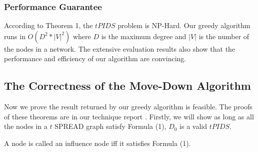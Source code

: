 \subsubsection*{Performance Guarantee}
According to Theorem 1, the $tPIDS$ problem is NP-Hard. Our greedy algorithm runs in $O(D^2*|V|^2)$ where $D$ is the maximum degree and $|V|$ is the number of the nodes in a network. The extensive evaluation results also show that the performance and efficiency of our algorithm are convincing.
\subsection{The Correctness of the Move-Down Algorithm}
Now we prove the result returned by our greedy algorithm is feasible. The proofs of these theorems are in our technique report\cite{ShiTech} .
Firstly, we will show as long as all the nodes in a $t$ SPREAD graph satisfy Formula (1), $D_0$ is a valid $tPIDS$.
\begin{theorem}
	A node is called an influence node iff it satisfies Formula (1).
\end{theorem}

